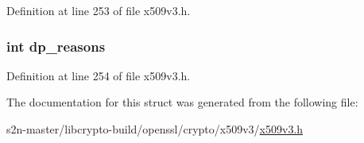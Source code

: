 Definition at line 253 of file x509v3.\+h.

\subsubsection[{\texorpdfstring{dp\+\_\+reasons}{dp_reasons}}]{\setlength{\rightskip}{0pt plus 5cm}int dp\+\_\+reasons}\hypertarget{struct_d_i_s_t___p_o_i_n_t__st_ae8fb53d1aff408520802c24fdfaccc30}{}\label{struct_d_i_s_t___p_o_i_n_t__st_ae8fb53d1aff408520802c24fdfaccc30}


Definition at line 254 of file x509v3.\+h.



The documentation for this struct was generated from the following file\+:\begin{DoxyCompactItemize}
\item 
s2n-\/master/libcrypto-\/build/openssl/crypto/x509v3/\hyperlink{crypto_2x509v3_2x509v3_8h}{x509v3.\+h}\end{DoxyCompactItemize}
